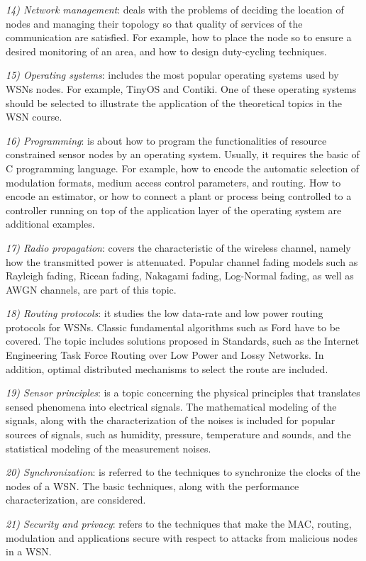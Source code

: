 \documentclass[onecolumn,12pt,draftclsnofoot,a4paper,peerreview]{IEEEtran}
\begin{document}
{\em 14) Network management}: deals with the problems of deciding the location of nodes and managing their topology so that quality of services of the communication are satisfied. For example, how to place the node so to ensure a desired monitoring of an area, and how to design duty-cycling techniques. 

{\em 15) Operating systems}: includes the most popular operating systems used by WSNs nodes. For example, TinyOS and Contiki. One of these operating systems should be selected to illustrate the application of the theoretical topics in the WSN course. 

{\em 16) Programming}: is about how to program the functionalities of resource constrained sensor nodes by an operating system. Usually, it requires the basic of C programming language. For example, how to encode the automatic selection of modulation formats, medium access control parameters, and routing. How to encode an estimator, or how to connect a plant or process being controlled to a controller running on top of the application layer of the operating system are additional examples. 


{\em 17) Radio propagation}: covers the characteristic of the wireless channel, namely how the transmitted power is attenuated. Popular channel fading models such as Rayleigh fading, Ricean fading, Nakagami fading, Log-Normal fading, as well as AWGN channels, are part of this topic. 

{\em 18) Routing protocols}: it studies the low data-rate and low power routing protocols for WSNs. Classic fundamental algorithms such as Ford have to be covered. The topic includes solutions proposed in Standards, such as the Internet Engineering Task Force Routing over Low Power and Lossy Networks. In addition, optimal distributed mechanisms to select the route are included. 

{\em 19) Sensor principles}: is a topic concerning the physical principles that translates sensed phenomena into electrical signals. The mathematical modeling of the signals, along with the characterization of the noises is included for popular sources of signals, such as humidity, pressure, temperature and sounds, and the statistical modeling of the measurement noises. 

{\em 20) Synchronization}: is referred to the techniques to synchronize the clocks of the nodes of a WSN. The basic techniques, along with the performance characterization, are considered. 

{\em 21) Security and privacy}: refers to the techniques that make the MAC, routing, modulation and applications secure with respect to attacks from malicious nodes in a WSN. 
\end{document}
